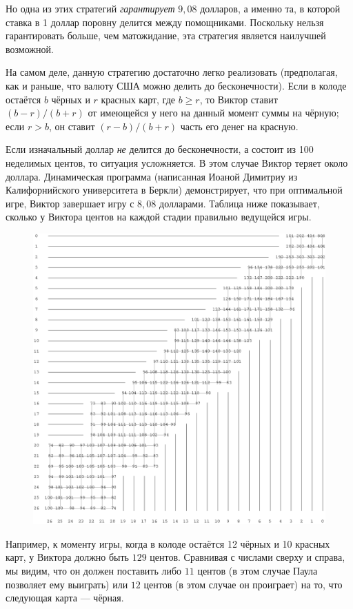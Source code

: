 Но одна из этих стратегий \emph{гарантирует} $9{,}08$ долларов, а именно та, в которой ставка в 1 доллар поровну делится между помощниками.
Поскольку нельзя гарантировать больше, чем матожидание, эта стратегия является наилучшей возможной.\heart

На самом деле, данную стратегию достаточно легко реализовать (предполагая, как и раньше, что валюту США можно делить до бесконечности).
Если в колоде остаётся $b$ чёрных и $r$ красных карт, где $b\ge r$, то Виктор ставит $(b - r)/(b + r)$ от имеющейся у него на данный момент суммы на чёрную; если $r > b$, он ставит $(r - b)/(b + r)$ часть его денег на красную.

\medskip

Если изначальный доллар \emph{не} делится до бесконечности, а состоит из 100 неделимых центов, то ситуация усложняется.
В этом случае Виктор теряет около доллара.
Динамическая программа (написанная Иоаной Димитриу %
из Калифорнийского университета в Беркли) демонстрирует, что при оптимальной игре, Виктор завершает игру с $8{,}08$ долларами.
Таблица ниже показывает, сколько у Виктора центов на каждой стадии правильно ведущейся игры.
\begin{figure}[h!]
\centering
\includegraphics[scale=0.63]{Figs/Games/ioana}
\end{figure}
Например, к моменту игры, когда в колоде остаётся 12 чёрных и 10 красных карт, у Виктора должно быть $129$ центов. 
Сравнивая с числами сверху и справа, мы видим, что он должен поставить либо $11$ центов (в этом случае Паула позволяет ему выиграть) или $12$ центов (в этом случае он проиграет) на то, что следующая карта --- чёрная.

